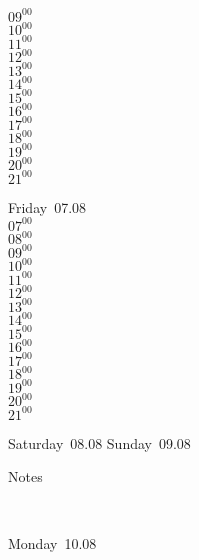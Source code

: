 \documentclass[11pt,a4paper]{book}\usepackage[]{graphicx}\usepackage[]{color}
\begin{document}
{{{{{\begin{tcolorbox}
{$09^{00}$\\
$10^{00}$\\
$11^{00}$\\
$12^{00}$\\
$13^{00}$\\
$14^{00}$\\
$15^{00}$\\
$16^{00}$\\
$17^{00}$\\
$18^{00}$\\
$19^{00}$\\
$20^{00}$\\
$21^{00}$}\\
\end{tcolorbox} 
%
\begin{tcolorbox}
Friday~07.08\\
{ 
$07^{00}$\\
$08^{00}$\\
$09^{00}$\\
$10^{00}$\\
$11^{00}$\\
$12^{00}$\\
$13^{00}$\\
$14^{00}$\\
$15^{00}$\\
$16^{00}$\\
$17^{00}$\\
$18^{00}$\\
$19^{00}$\\
$20^{00}$\\
$21^{00}$}\\
\end{tcolorbox} 
%
\begin{tcolorbox}[height=(\textheight-10mm)/6]
Saturday~08.08
\tcblower
Sunday~09.08
\end{tcolorbox} %
%
\begin{tcolorbox}[height=(\textheight-10mm)/6,sidebyside=false]
Notes
\end{tcolorbox}
\clearpage
\vspace{2 mm}\\
%
%
\begin{tcolorbox}
Monday~10.08\\

\end{tcolorbox}}}}}}
\end{document}
